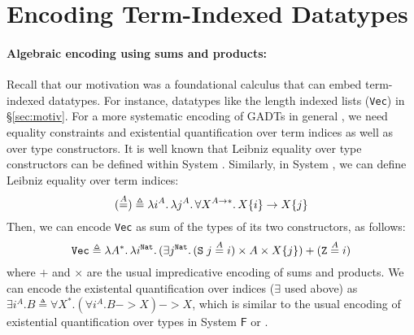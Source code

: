 \section{Encoding Term-Indexed Datatypes} \label{sec:data}
\paragraph{Algebraic encoding using sums and products:}
Recall that our motivation was a foundational calculus
that can embed term-indexed datatypes. For instance, 
datatypes like the length indexed lists ({\small\tt Vec}) in \S\ref{sec:motiv}.
For a more systematic encoding of GADTs in general
\cite{Sheard04equality,crary98intensional},
we need  equality constraints and existential quantification
over term indices as well as over type constructors.
It is well known that Leibniz equality over type constructors
can be defined within System \Fw. %
Similarly, in System \Fi, we can define Leibniz equality over term indices:
\[
(\stackrel{A}{=}) \triangleq
        \lambda i^A.\, \lambda j^A.\, \forall X^{A\to*}.\, X\{i\}\to X\{j\}
\]
Then, we can encode {\small\tt Vec} as sum of the types of its two constructors,
as follows:
\[ \mathtt{Vec} \triangleq \lambda A^{*}.\,\lambda i^\texttt{Nat}.\,
        (\exists j^\texttt{Nat}.\,(\texttt{S}\;j\stackrel{A}{=}i)\times A \times X\{j\})
        +
        (\texttt{Z}\stackrel{A}{=}i)
\]
where $+$ and $\times$ are the usual impredicative encoding of sums
and products. We can encode the existental quantification over indices
($\exists$ used above) as
$ \exists i^A.B \triangleq \forall X^{*}. (\forall i^A.B -> X) -> X $,
which is similar to the usual encoding of existential quantification
over types in System $\mathsf{F}$ or \Fw.

